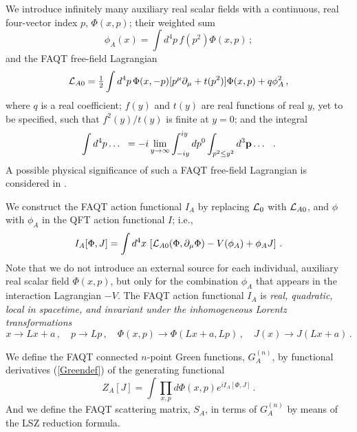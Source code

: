 \documentclass[a4paper,12pt]{article}
\newcommand{\half}{{\textstyle{1\over2}}}
\newcommand{\polje}{\phi}
\newcommand{\polA}{\polje_A}
\newcommand{\Polje}{\Phi}
\newcommand{\akcija}{I}
\newcommand{\akcijaA}{\akcija_A}
\newcommand{\Lag}{{\cal L}}
\newcommand{\Lagf}{\Lag_{0}}
\newcommand{\Lagi}{V}
\newcommand{\LagAf}{\Lag_{A0}}
\newcommand{\Gf}{G^{(n)}}
\newcommand{\GfA}{\Gf_A}
\newcommand{\SmA}{S_A}
\begin{document}
We introduce infinitely many auxiliary real scalar fields with a continuous, real four-vector index $p$, $\Polje(x,p)$; their weighted sum
\begin{equation}
   \polA(x) = \int d^4p\, f(p^2) \Polje(x,p) \,;
   \label{tranpolje}
\end{equation}
and the FAQT free-field Lagrangian 
\begin{equation}
   \LagAf =  \half \int d^4p\,\Polje(x,-p)[ p^\mu \partial_\mu + t(p^2) ] \Polje(x, p) + q \polA^2 \,,
   \label{AfreeLagr}
\end{equation}
where $q$ is a real coefficient; $f(y)$ and $t(y)$ are real functions of real $y$, yet to be specified, such that $f^2(y)/t(y)$ is finite at $y = 0$; and the integral
\begin{equation}
   \int d^4p \dots \;\; = -i \lim_{y\to \infty} \int_{-iy}^{iy} dp^0 \int _{p^2 \le y^2} d^3{\bf  p} \dots \;\; \,.
   \label{traninte}
\end{equation}
A possible physical significance of such a FAQT free-field Lagrangian is considered in \cite{mi001}.

We construct the FAQT action functional $\akcijaA$ by replacing $\Lagf$ with $\LagAf$, and $\polje$ with $\polA$ in the QFT action functional $\akcija$; i.e.,
\begin{equation}
   \akcijaA[\Polje, J] = \int d^4x \, \left [ \LagAf(\Polje, \partial_\mu\Polje) - \Lagi(\polA) + \polA J \right ] \,.
  \label{Aakcija}
\end{equation}
Note that we do not introduce an external source for each individual, auxiliary real scalar field $\Polje(x,p)$, but only for the combination $\polA$ that appears in the interaction Lagrangian $-V$. The FAQT action functional $\akcijaA$ is \it real, quadratic, local in spacetime, and invariant under the inhomogeneous Lorentz transformations \rm
\begin{equation}
   x \to L x + a \,, \quad   
   p \to L p \,, \quad   
   \Polje(x,p) \to \Polje(L x + a, L p) \,, \quad
   J(x) \to J(L x + a) \,.
   \label{lorentztrans}
\end{equation}

We define the FAQT connected $n$-point Green functions, $\GfA$, by functional derivatives (\ref{Greendef}) of the generating functional
\begin{equation}
   Z_A[J] = \int \prod_{x,p} d\Polje(x,p) e^{ i \akcijaA [\Polje, J] } \,.
  \label{Agenfunc}
\end{equation}
And we define the FAQT scattering matrix, $\SmA$, in terms of $\GfA$ by means of the LSZ reduction formula.
\end{document}
